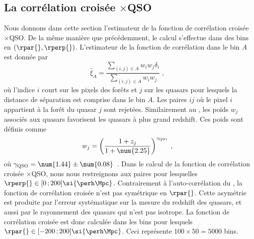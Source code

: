 \subsection{La corrélation croisée \lya{}$\times$QSO}
\label{subsec:xcf_estimateur}
Nous donnons dans cette section l'estimateur de la fonction de corrélation croisée \lya{}$\times$QSO. De la même manière que précédemment, le calcul s'effectue dans des bins en $(\rpar{}, \rperp{})$. L'estimateur de la fonction de corrélation dans le bin $A$ est donnée par
\begin{equation}
  \label{eq:xiqf}
\hat  \xi_A = \frac{
    \sum\limits_{(i,j)\in A} w_i w_j \delta_i
  }{
    \sum\limits_{(i,j)\in A} w_i w_j
  }
  \; ,
\end{equation}
où l'indice $i$ court sur les pixels des forêts et $j$ sur les quasars pour lesquels la distance de séparation est comprise dans le bin $A$. Les paires $ij$ où le pixel $i$ appartient à la forêt du quasar $j$ sont rejetées.
Similairement au \lya{}, les poids $w_j$ associés aux quasars favorisent les quasars à plus grand redshift. Ces poids sont définis comme
\begin{equation}
  \label{eq:weights3}
  w_j = \left(\frac{1 + z_j}{1 + \num{2.25}}\right)^{\gamma_{\textsc{QSO}}} \; ,
\end{equation}
où $\gamma_{\textsc{QSO}} = \num{1.44} \pm \num{0.08}$~\autocite{Bourboux2019}. Dans le calcul de la fonction de corrélation croisée \lya{}$\times$QSO, nous nous restreignons aux paires pour lesquelles $\rperp{} \in [0 \, ; 200] \si{\perh\Mpc}$.
Contrairement à l'auto-corrélation du \lya{}, la fonction de corrélation croisée n'est pas symétrique en $\rpar{}$.
Cette asymétrie est produite par l'erreur systématique sur la mesure du redshift des quasars, et aussi par le rayonnement des quasars qui n'est pas isotrope.
La fonction de corrélation croisée est donc calculée dans les bins pour lesquels $\rpar{} \in [-200 \, ; 200] \si{\perh\Mpc}$. Ceci représente $100 \times 50 = \num{5000}$ bins.



